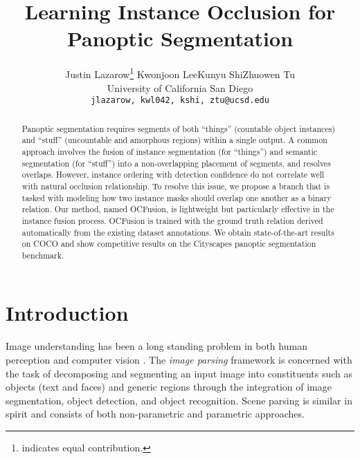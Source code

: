 \documentclass[10pt,twocolumn,letterpaper]{article}
\begin{document}
\title{Learning Instance Occlusion for Panoptic Segmentation}

\author{Justin Lazarow\thanks{ \:indicates equal contribution.} \quad Kwonjoon Lee\footnotemark[1] \quad Kunyu Shi\footnotemark[1] \quad Zhuowen Tu\\
University of California San Diego\\
{\tt\small jlazarow, kwl042, kshi, ztu@ucsd.edu}
}

\maketitle
\thispagestyle{empty}

\begin{abstract}
  Panoptic segmentation requires segments of both ``things'' (countable object instances) and  ``stuff'' (uncountable and amorphous regions) within a single output. A common approach involves the fusion of instance segmentation (for ``things'') and semantic segmentation (for ``stuff'') into a non-overlapping placement of segments, and resolves overlaps.
  However, instance ordering with detection confidence do not correlate well with natural occlusion relationship.
  To resolve this issue, we propose a branch that is tasked with modeling how two instance masks should overlap one another as a binary relation. Our method, named OCFusion, is lightweight but particularly effective in the instance fusion process. OCFusion is trained with the ground truth relation derived automatically from the existing dataset annotations. We obtain state-of-the-art results on COCO and show competitive results on the Cityscapes panoptic segmentation benchmark.
\end{abstract}


\vspace{-5mm}
\section{Introduction}
Image understanding has been a long standing problem in both human perception \cite{biederman1987recognition} and computer vision \cite{marr1982vision}. The {\em image parsing} framework \cite{tu2005image} is concerned with the task of decomposing and segmenting an input image into constituents such as objects (text and faces) and generic regions through the integration of image segmentation, object detection, and object recognition. Scene parsing is similar in spirit and consists of both non-parametric \cite{tighe2014scene} and parametric \cite{zhao2016pspnet} approaches.
\end{document}
